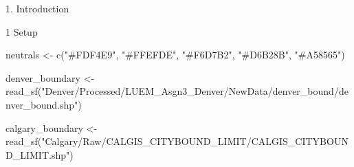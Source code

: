 \documentclass[
  ignorenonframetext,
]{beamer}
\newenvironment{Shaded}{\begin{snugshade}}{\end{snugshade}}
\newcommand{\FunctionTok}[1]{\textcolor[rgb]{0.00,0.00,0.00}{#1}}
\newcommand{\NormalTok}[1]{#1}
\newcommand{\OtherTok}[1]{\textcolor[rgb]{0.56,0.35,0.01}{#1}}
\newcommand{\StringTok}[1]{\textcolor[rgb]{0.31,0.60,0.02}{#1}}
\begin{document}
\begin{frame}[fragile]{1. Introduction}
\begin{block}{1 Setup}
\begin{Shaded}
\begin{Highlighting}[]
\NormalTok{neutrals }\OtherTok{\textless{}{-}} \FunctionTok{c}\NormalTok{(}\StringTok{"\#FDF4E9"}\NormalTok{, }\StringTok{"\#FFEFDE"}\NormalTok{, }\StringTok{"\#F6D7B2"}\NormalTok{, }\StringTok{"\#D6B28B"}\NormalTok{, }\StringTok{"\#A58565"}\NormalTok{)}
\end{Highlighting}
\end{Shaded}

\begin{Shaded}
\begin{Highlighting}[]
\NormalTok{denver\_boundary }\OtherTok{\textless{}{-}}\FunctionTok{read\_sf}\NormalTok{(}\StringTok{"Denver/Processed/LUEM\_Asgn3\_Denver/NewData/denver\_bound/denver\_bound.shp"}\NormalTok{)}

\NormalTok{calgary\_boundary }\OtherTok{\textless{}{-}} \FunctionTok{read\_sf}\NormalTok{(}\StringTok{"Calgary/Raw/CALGIS\_CITYBOUND\_LIMIT/CALGIS\_CITYBOUND\_LIMIT.shp"}\NormalTok{)}
\end{Highlighting}
\end{Shaded}
\end{block}
\end{frame}
\end{document}
